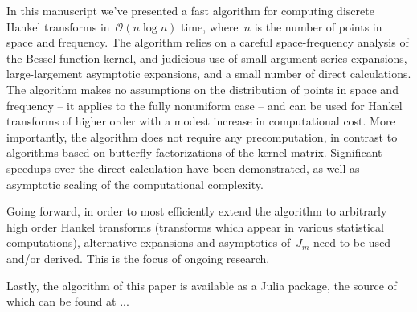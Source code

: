 
In this manuscript we've presented a fast algorithm for computing discrete
Hankel transforms in~$\mathcal O (n \log n)$ time, where~$n$ is the number of points in
space and frequency. The algorithm relies on a careful space-frequency analysis
of the Bessel function kernel, and judicious use of small-argument series
expansions, large-largement asymptotic expansions, and a small number of direct
calculations. The algorithm makes no assumptions on the distribution of points
in space and frequency -- it applies to the fully nonuniform case -- and can be
used for Hankel transforms of higher order with a modest increase in
computational cost. More importantly, the algorithm does not require any
precomputation, in contrast to algorithms based on butterfly factorizations of
the kernel matrix. Significant speedups over the direct calculation have been
demonstrated, as well as asymptotic scaling of the computational complexity.

Going forward, in order to most efficiently
extend the algorithm to arbitrarly high order Hankel
transforms (transforms which appear in various statistical computations),
alternative expansions and asymptotics of~$J_m$ need to be used and/or
derived. This is the focus of ongoing research.

Lastly, the algorithm of this paper is available {\color{red} as a Julia
  package, the source of which can be found at ... }




